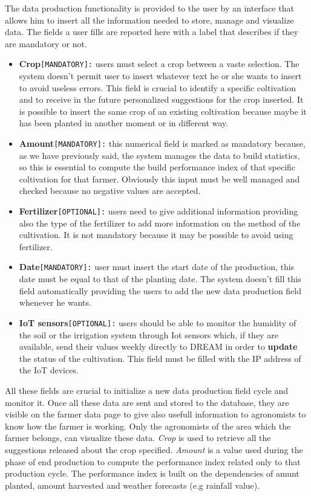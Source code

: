 		The data production functionality is provided to the user by an interface that allows him to insert all the information needed to store, manage and visualize data. The fields a user fills are reported here with a label that describes if they are mandatory or not.
		
		\begin{itemize}
			\item \textbf{Crop}\texttt{[MANDATORY]:} users must select a crop between a vaste selection. The system doesn't permit user to insert whatever text he or she wants to insert to avoid useless errors. This field is crucial to identify a specific coltivation and to receive in the future personalized suggestions for the crop inserted. It is possible to insert the same crop of an existing coltivation because maybe it has been planted in another moment or in different way. 
			
			\item \textbf{Amount}\texttt{[MANDATORY]:} this numerical field is marked as mandatory because, as we have previously said, the system manages the data to build statistics, so this is essential to compute the build performance index of that specific coltivation for that farmer. Obviously this input must be well managed and checked because no negative values are accepted.
			
			\item \textbf{Fertilizer}\texttt{[OPTIONAL]:} users need to give additional information providing also the type of the fertilizer to add more information on the method of the cultivation. It is not mandatory because it may be possible to avoid using fertilizer.
			
			\item \textbf{Date}\texttt{[MANDATORY]:} user must insert the start date of the production, this date must be equal to that of the planting date. The system doesn't fill this field automatically providing the users to add the new data production field whenever he wants.
			
			\item \textbf{IoT sensors}\texttt{[OPTIONAL]:} users should be able to monitor the humidity of the soil or the irrigation system through Iot sensors which, if they are available, send their values weekly directly to DREAM in order to \textbf{update} the status of the cultivation. This field must be filled with the IP address of the IoT devices.
		\end{itemize}
	
	All these fields are crucial to initialize a new data production field cycle and monitor it. Once all these data are sent and stored to the database, they are visible on the farmer data page to give also usefull information to agronomists to know how the farmer is working. Only the agronomists of the area which the farmer belongs, can visualize these data. \textit{Crop} is used to retrieve all the suggestions released about the crop specified. \textit{Amount} is a value used during the phase of end production to compute the performance index related only to that production cycle. The performance index is built on the dependencies of amunt planted, amount harvested and weather forecasts (e.g rainfall value).  
		

